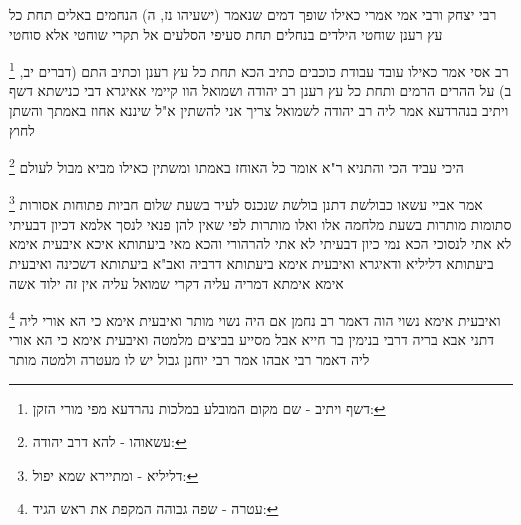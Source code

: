 \documentclass[12pt, openany]{book}
\newcommand{\footnotecomment}[1]{
	\renewcommand\thefootnote{}
	\footnote{#1}}
\newcommand{\commenta}[1]{\footnotecomment{#1}}
\begin{document}
{רבי יצחק ורבי אמי אמרי כאילו שופך דמים שנאמר (ישעיהו נז, ה) הנחמים באלים תחת כל עץ רענן שוחטי הילדים בנחלים תחת סעיפי הסלעים אל תקרי שוחטי אלא סוחטי 
\commenta{דשף ויתיב - שם מקום המובלע במלכות נהרדעא מפי מורי הזקן:}
רב אסי אמר כאילו עובד עבודת כוכבים כתיב הכא תחת כל עץ רענן וכתיב התם (דברים יב, ב) על ההרים הרמים ותחת כל עץ רענן 
רב יהודה ושמואל הוו קיימי אאיגרא דבי כנישתא דשף ויתיב בנהרדעא אמר ליה רב יהודה לשמואל צריך אני להשתין א"ל שיננא אחוז באמתך והשתן לחוץ 
\commenta{עשאוהו - להא דרב יהודה:}
היכי עביד הכי והתניא ר"א אומר כל האוחז באמתו ומשתין כאילו מביא מבול לעולם 
\commenta{דליליא - ומתיירא שמא יפול:}
אמר אביי עשאו כבולשת דתנן בולשת שנכנס לעיר בשעת שלום חביות פתוחות אסורות סתומות מותרות בשעת מלחמה אלו ואלו מותרות לפי שאין להן פנאי לנסך אלמא דכיון דבעיתי לא אתי לנסוכי הכא נמי כיון דבעיתי לא אתי להרהורי 
והכא מאי ביעתותא איכא איבעית אימא ביעתותא דליליא ודאיגרא ואיבעית אימא ביעתותא דרביה ואב"א ביעתותא דשכינה ואיבעית אימא אימתא דמריה עליה דקרי שמואל עליה אין זה ילוד אשה 
\commenta{עטרה - שפה גבוהה המקפת את ראש הגיד:}
ואיבעית אימא נשוי הוה דאמר רב נחמן אם היה נשוי מותר 
ואיבעית אימא כי הא אורי ליה דתני אבא בריה דרבי בנימין בר חייא אבל מסייע בביצים מלמטה ואיבעית אימא כי הא אורי ליה דאמר רבי אבהו אמר רבי יוחנן גבול יש לו מעטרה ולמטה מותר}
\end{document}
